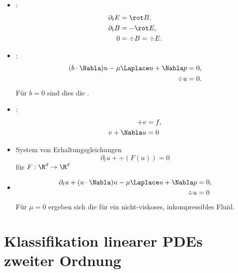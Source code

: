 \begin{ex} \label{1.12}
	\begin{itemize}
		\item
			:
			\begin{align*}
				\partial_t E &= \rot B, \\
				\partial_t B &= - \rot E, \\
				0 &= \div B = \div E.
			\end{align*}
		\item
			:
			\begin{align*}
				(b \cdot \Nabla) u - \mu \Laplace u + \Nabla p &= 0, \\
				\div u &= 0.
			\end{align*}
			Für $b = 0$ sind dies die .
		\item
			:
			\begin{align*}
				\div v &= f, \\
				v + \Nabla u &= 0
			\end{align*}
	\end{itemize}
\end{ex}

\begin{ex} \label{1.13}
	\begin{itemize}
		\item
			System von Erhaltungsgleichungen
			\[
				\partial_t u + \div(F(u)) = 0
			\]
			für $F: \R^d \to \R^d$
		\item
			\begin{align*}
				\partial_t u + (u\cdot \Nabla) u - \mu \Laplace u + \Nabla p &= 0, \\
				\div u &= 0
			\end{align*}
			Für $\mu = 0$ ergeben sich die  für ein nicht-viskoses, inkompressibles Fluid.
	\end{itemize}
\end{ex}


\section{Klassifikation linearer PDEs zweiter Ordnung} \label{sec:1.2}


